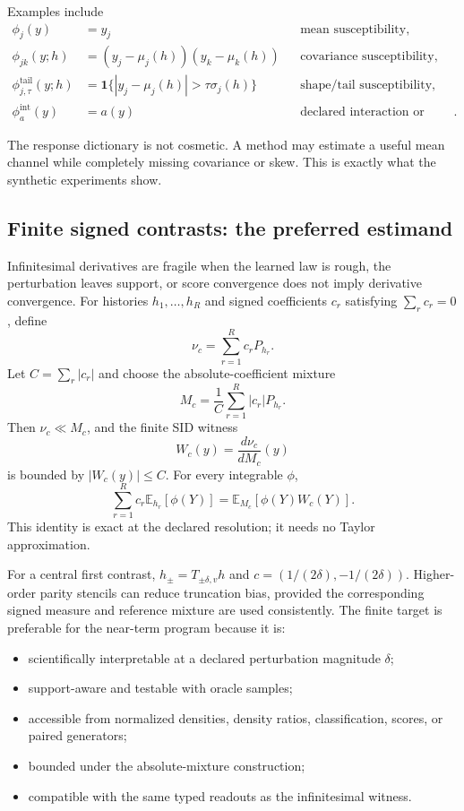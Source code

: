 \documentclass[10pt]{article}
\newcommand{\E}{\mathbb{E}}
\begin{document}
Examples include
\begin{align*}
  \phi_j(y)&=y_j &&\text{mean susceptibility},\\
  \phi_{jk}(y;h)&=(y_j-\mu_j(h))(y_k-\mu_k(h))
    &&\text{covariance susceptibility},\\
  \phi^{\mathrm{tail}}_{j,\tau}(y;h)&=
    \mathbf 1\{|y_j-\mu_j(h)|>\tau\sigma_j(h)\}
    &&\text{shape/tail susceptibility},\\
  \phi^{\mathrm{int}}_a(y)&=a(y)
    &&\text{declared interaction or occupancy channel}.
\end{align*}

The response dictionary is not cosmetic. A method may estimate a useful mean channel while completely missing covariance or skew. This is exactly what the synthetic experiments show.

\subsection{Finite signed contrasts: the preferred estimand}

Infinitesimal derivatives are fragile when the learned law is rough, the perturbation leaves support, or score convergence does not imply derivative convergence. For histories \(h_1,\ldots,h_R\) and signed coefficients \(c_r\) satisfying \(\sum_r c_r=0\), define
\[
  \nu_c=\sum_{r=1}^R c_r P_{h_r}.
\]
Let \(C=\sum_r|c_r|\) and choose the absolute-coefficient mixture
\[
  M_c=\frac{1}{C}\sum_{r=1}^R |c_r|P_{h_r}.
\]
Then \(\nu_c\ll M_c\), and the finite SID witness
\[
  W_c(y)=\frac{d\nu_c}{dM_c}(y)
\]
is bounded by \(|W_c(y)|\le C\). For every integrable \(\phi\),
\begin{equation}
  \sum_{r=1}^R c_r\E_{h_r}[\phi(Y)]
  =\E_{M_c}[\phi(Y)W_c(Y)].
  \label{eq:finite-witness}
\end{equation}
This identity is exact at the declared resolution; it needs no Taylor approximation.

For a central first contrast, \(h_\pm=T_{\pm\delta,v}h\) and \(c=(1/(2\delta),-1/(2\delta))\). Higher-order parity stencils can reduce truncation bias, provided the corresponding signed measure and reference mixture are used consistently. The finite target is preferable for the near-term program because it is:

\begin{itemize}
  \item scientifically interpretable at a declared perturbation magnitude \(\delta\);
  \item support-aware and testable with oracle samples;
  \item accessible from normalized densities, density ratios, classification, scores, or paired generators;
  \item bounded under the absolute-mixture construction;
  \item compatible with the same typed readouts as the infinitesimal witness.
\end{itemize}
\end{document}
